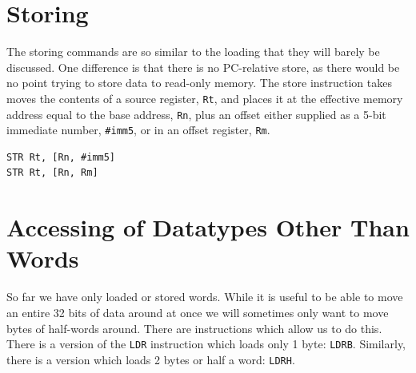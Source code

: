 \section{Storing}
The storing commands are so similar to the loading that they will barely be discussed. One difference is that there is no PC-relative store, as there would be no point trying to store data to read-only memory. The store instruction takes moves the contents of a source register, \texttt{Rt}, and places it at the effective memory address equal to the base address, \texttt{Rn}, plus an offset either supplied as a 5-bit immediate number, \texttt{\#imm5}, or in an offset register, \texttt{Rm}.

\begin{lstlisting}[fontadjust=true,frame=trBL]
STR Rt, [Rn, #imm5]
STR Rt, [Rn, Rm]
\end{lstlisting}

\section{Accessing of Datatypes Other Than Words}
So far we have only loaded or stored words. While it is useful to be able to move an entire 32 bits of data around at once we will sometimes only want to move bytes of half-words around. There are instructions which allow us to do this. There is a version of the \texttt{LDR} instruction which loads only 1 byte: \texttt{LDRB}. Similarly, there is a version which loads 2 bytes or half a word: \texttt{LDRH}. 
